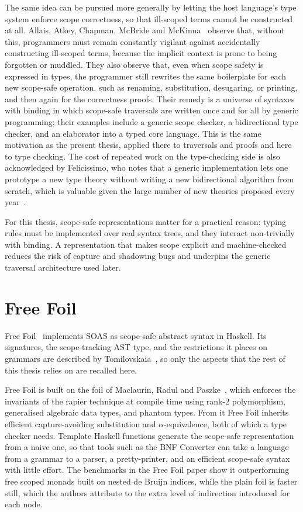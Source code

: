The same idea can be pursued more generally by letting the host language's type system enforce scope correctness, so that ill-scoped terms cannot be constructed at all. Allais, Atkey, Chapman, McBride and McKinna~\cite{allais2021universe} observe that, without this, programmers must remain constantly vigilant against accidentally constructing ill-scoped terms, because the implicit context is prone to being forgotten or muddled. They also observe that, even when scope safety is expressed in types, the programmer still rewrites the same boilerplate for each new scope-safe operation, such as renaming, substitution, desugaring, or printing, and then again for the correctness proofs. Their remedy is a universe of syntaxes with binding in which scope-safe traversals are written once and for all by generic programming; their examples include a generic scope checker, a bidirectional type checker, and an elaborator into a typed core language. This is the same motivation as the present thesis, applied there to traversals and proofs and here to type checking. The cost of repeated work on the type-checking side is also acknowledged by Felicissimo, who notes that a generic implementation lets one prototype a new type theory without writing a new bidirectional algorithm from scratch, which is valuable given the large number of new theories proposed every year~\cite{felicissimo2023generic}.

For this thesis, scope-safe representations matter for a practical reason: typing rules must be implemented over real syntax trees, and they interact non-trivially with binding. A representation that makes scope explicit and machine-checked reduces the risk of capture and shadowing bugs and underpins the generic traversal architecture used later.

\section{Free Foil}
\label{sec:lr-freefoil}

Free Foil~\cite{kudasov2024freefoil,freefoil} implements SOAS as scope-safe abstract syntax in Haskell. Its signatures, the scope-tracking AST type, and the restrictions it places on grammars are described by Tomilovskaia~\cite[Secs.~2.4 and~3.1]{tomilovskaia2025bidir}, so only the aspects that the rest of this thesis relies on are recalled here.

Free Foil is built on the foil of Maclaurin, Radul and Paszke~\cite{maclaurin2023foil}, which enforces the invariants of the rapier technique at compile time using rank-2 polymorphism, generalised algebraic data types, and phantom types. From it Free Foil inherits efficient capture-avoiding substitution and $\alpha$-equivalence, both of which a type checker needs. Template Haskell functions generate the scope-safe representation from a naive one, so that tools such as the BNF Converter can take a language from a grammar to a parser, a pretty-printer, and an efficient scope-safe syntax with little effort. The benchmarks in the Free Foil paper show it outperforming free scoped monads built on nested de Bruijn indices, while the plain foil is faster still, which the authors attribute to the extra level of indirection introduced for each node.


